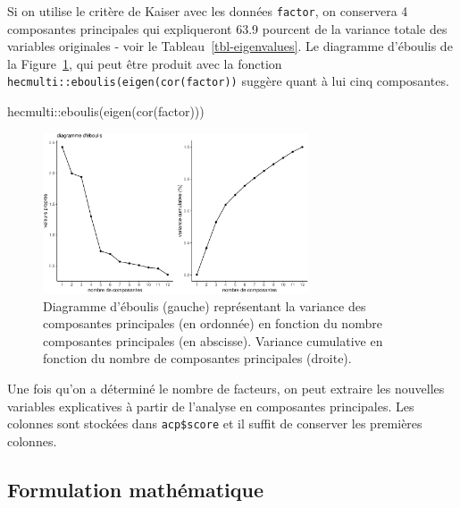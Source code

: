 \documentclass[
  11pt,
  letterpaper,
]{book}
\newenvironment{Shaded}{\begin{snugshade}}{\end{snugshade}}
\newcommand{\FunctionTok}[1]{\textcolor[rgb]{0.28,0.35,0.67}{#1}}
\newcommand{\NormalTok}[1]{\textcolor[rgb]{0.00,0.23,0.31}{#1}}
\newcommand{\SpecialCharTok}[1]{\textcolor[rgb]{0.37,0.37,0.37}{#1}}
\theoremstyle{definition}
\theoremstyle{remark}
\begin{document}
Si on utilise le critère de Kaiser avec les données \texttt{factor}, on
conservera 4 composantes principales qui expliqueront 63.9 pourcent de
la variance totale des variables originales - voir le
Tableau~\ref{tbl-eigenvalues}. Le diagramme d'éboulis de la
Figure~\ref{fig-screeplot}, qui peut être produit avec la fonction
\texttt{hecmulti::eboulis(eigen(cor(factor))} suggère quant à lui cinq
composantes.

\begin{Shaded}
\begin{Highlighting}[]
\NormalTok{hecmulti}\SpecialCharTok{::}\FunctionTok{eboulis}\NormalTok{(}\FunctionTok{eigen}\NormalTok{(}\FunctionTok{cor}\NormalTok{(factor)))}
\end{Highlighting}
\end{Shaded}

\begin{figure}[ht!]

{\centering \includegraphics[width=0.7\textwidth,height=\textheight]{./02-analysefactorielle_files/figure-pdf/fig-screeplot-1.pdf}

}

\caption{\label{fig-screeplot}Diagramme d'éboulis (gauche) représentant
la variance des composantes principales (en ordonnée) en fonction du
nombre composantes principales (en abscisse). Variance cumulative en
fonction du nombre de composantes principales (droite).}

\end{figure}

Une fois qu'on a déterminé le nombre de facteurs, on peut extraire les
nouvelles variables explicatives à partir de l'analyse en composantes
principales. Les colonnes sont stockées dans \texttt{acp\$score} et il
suffit de conserver les premières colonnes.

\hypertarget{formulation-mathuxe9matique}{%
\subsection{Formulation
mathématique}\label{formulation-mathuxe9matique}}
\end{document}
